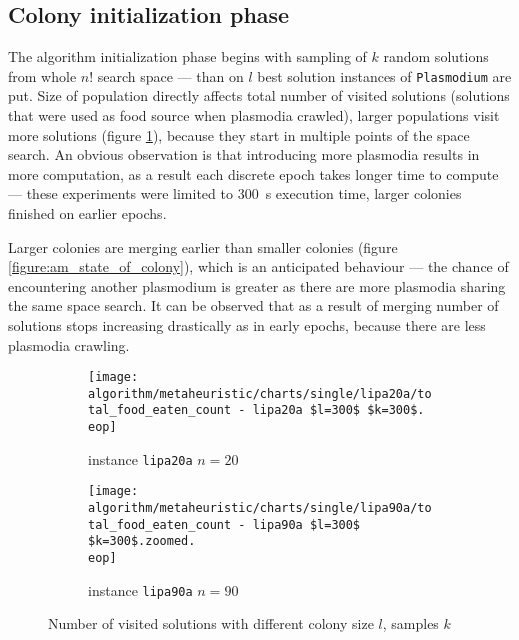 \subsection{Colony initialization phase}

The algorithm initialization phase begins with sampling of $k$ random solutions from whole $n!$ search space --- than on $l$ best solution instances of \texttt{Plasmodium} are put. Size of population directly affects total number of visited solutions (solutions that were used as food source when plasmodia crawled), larger populations visit more solutions (figure \ref{figure:am_visited_solutions}), because they start in multiple points of the space search. An obvious observation is that introducing more plasmodia results in more computation, as a result each discrete epoch takes longer time to compute --- these experiments were limited to 300~s execution time, larger colonies finished on earlier epochs.

Larger colonies are merging earlier than smaller colonies (figure \ref{figure:am_state_of_colony}), which is an anticipated behaviour --- the chance of encountering another plasmodium is greater as there are more plasmodia sharing the same space search. It can be observed that as a result of merging number of solutions stops increasing drastically as in early epochs, because there are less plasmodia crawling.

\begin{figure}
  \centering

  \begin{subfigure}{\textwidth}
    \texttt{[image: algorithm/metaheuristic/charts/single/lipa20a/total\_food\_eaten\_count - lipa20a \$l=300\$ \$k=300\$.\\eop]}
    \caption{instance \texttt{lipa20a} $n=20$}
  \end{subfigure}
  \par\bigskip
  \begin{subfigure}{\textwidth}
    \texttt{[image: algorithm/metaheuristic/charts/single/lipa90a/total\_food\_eaten\_count - lipa90a \$l=300\$ \$k=300\$.zoomed.\\eop]}
    \caption{instance \texttt{lipa90a} $n=90$}
  \end{subfigure}
  
  \caption{Number of visited solutions with different colony size $l$, samples $k$}
  \label{figure:am_visited_solutions}
\end{figure}

